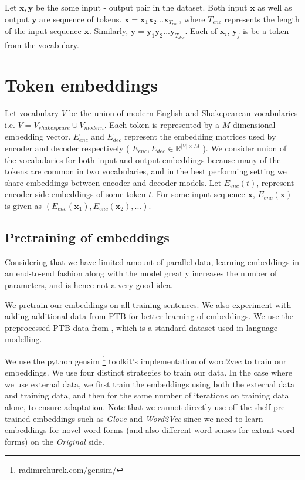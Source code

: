 Let $\mathbf{x}, \mathbf{y}$ be the some input - output pair in the dataset. Both input $\mathbf{x}$ as well as output $\mathbf{y}$ are sequence of tokens. $\mathbf{x} = \mathbf{x}_1 \mathbf{x}_2 ... \mathbf{x}_{T_{enc}}$, where $T_{enc}$ represents the length of the input sequence $\mathbf{x}$. Similarly, $\mathbf{y} = \mathbf{y}_1 \mathbf{y}_2 ... \mathbf{y}_{T_{dec}} $. Each of $\mathbf{x}_i $, $\mathbf{y}_j $ is be a token from the vocabulary.

\section{Token embeddings} \label{sec:Method2}
Let vocabulary $V$ be the union of modern English and Shakepearean vocabularies i.e. $V = V_{shakespeare} \cup V_{modern}$. Each token is represented by a $M$ dimensional embedding vector. $E_{enc}$ and $E_{dec}$ represent the embedding matrices used by encoder and decoder respectively ( $  E_{enc}, E_{dec} \in \mathbb{R}^{|V| \times M}  $ ). We consider union of the vocabularies for both input and output embeddings because many of the tokens are common in two vocabularies, and in the best performing setting we share embeddings between encoder and decoder models.
Let $E_{enc}(t)$, represent encoder side embeddings of some token $t$. For some input sequence $\mathbf{x}$, $E_{enc}(\mathbf{x})$ is given as $( E_{enc}(\mathbf{x}_1), E_{enc}(\mathbf{x}_2), ... ) $.

\subsection{Pretraining of embeddings}
Considering that we have limited amount of parallel data, learning embeddings in an end-to-end fashion along with the model greatly increases the number of parameters, and is hence not a very good idea.

We pretrain our embeddings on all training sentences. We also experiment with adding additional data from PTB \cite{marcus1993building} for better learning of embeddings. We use the preprocessed PTB data from \cite{mikolov2010recurrent}, which is a standard dataset used in language modelling.

We use the python gensim \footnote{\url{radimrehurek.com/gensim/}} toolkit's implementation of word2vec to train our embeddings. We use four distinct strategies to train our data. In the case where we use external data, we first train the embeddings using both the external data and training data, and then for the same number of iterations on training data alone, to ensure adaptation. Note that we cannot directly use off-the-shelf pre-trained embeddings such as \textit{Glove} \cite{pennington2014glove} and \textit{Word2Vec} \cite{mikolov2013efficient} since we need to learn embeddings for novel word forms (and also different word senses for extant word forms) on the \textit{Original} side.

